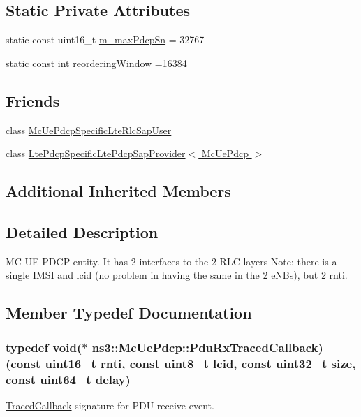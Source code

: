 \subsection*{Static Private Attributes}
\begin{DoxyCompactItemize}
\item 
static const uint16\+\_\+t \hyperlink{classns3_1_1McUePdcp_ab397f1cb87dfd3d4362f6d58adf968bc}{m\+\_\+max\+Pdcp\+Sn} = 32767
\item 
static const int \hyperlink{classns3_1_1McUePdcp_a6d90ca416e1c78dd78f4d530e64b4be0}{reordering\+Window} =16384
\end{DoxyCompactItemize}
\subsection*{Friends}
\begin{DoxyCompactItemize}
\item 
class \hyperlink{classns3_1_1McUePdcp_a4a20db5a4bcaa5d6e0c8d6de17f58cce}{Mc\+Ue\+Pdcp\+Specific\+Lte\+Rlc\+Sap\+User}
\item 
class \hyperlink{classns3_1_1McUePdcp_a0b33e48453cf06ca302f1bd5254c85c8}{Lte\+Pdcp\+Specific\+Lte\+Pdcp\+Sap\+Provider$<$ Mc\+Ue\+Pdcp $>$}
\end{DoxyCompactItemize}
\subsection*{Additional Inherited Members}


\subsection{Detailed Description}
MC UE P\+D\+CP entity. It has 2 interfaces to the 2 R\+LC layers Note\+: there is a single I\+M\+SI and lcid (no problem in having the same in the 2 e\+N\+Bs), but 2 rnti. 

\subsection{Member Typedef Documentation}
\subsubsection[{\texorpdfstring{Pdu\+Rx\+Traced\+Callback}{PduRxTracedCallback}}]{\setlength{\rightskip}{0pt plus 5cm}typedef void($\ast$  ns3\+::\+Mc\+Ue\+Pdcp\+::\+Pdu\+Rx\+Traced\+Callback) (const uint16\+\_\+t rnti, const uint8\+\_\+t lcid, const uint32\+\_\+t size, const uint64\+\_\+t {\bf delay})}\hypertarget{classns3_1_1McUePdcp_af8bd88140b3e71f03ae54e4381183794}{}\label{classns3_1_1McUePdcp_af8bd88140b3e71f03ae54e4381183794}
\hyperlink{classns3_1_1TracedCallback}{Traced\+Callback} signature for P\+DU receive event.


